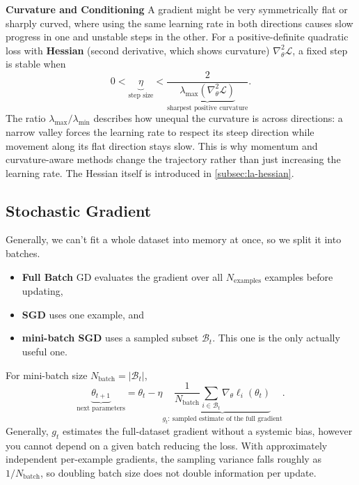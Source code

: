 \textbf{Curvature and Conditioning}
A gradient might be very symmetrically flat or sharply curved, where using the same learning rate in both directions causes slow progress in one and unstable steps in the other.
For a positive-definite quadratic loss with \textbf{Hessian} (second derivative, which shows curvature) $\nabla_\theta^2\mathcal L$, a fixed step is stable when
\[
    0<\underbrace{\eta}_{\text{step size}}
    <\frac{2}{\underbrace{\lambda_{\max}(\nabla_\theta^2\mathcal L)}_{\text{sharpest positive curvature}}}.
\]
The ratio $\lambda_{\max}/\lambda_{\min}$ describes how unequal the curvature is across directions: a narrow valley forces the learning rate to respect its steep direction while movement along its flat direction stays slow.
This is why momentum and curvature-aware methods change the trajectory rather than just increasing the learning rate.
The Hessian itself is introduced in \cref{subsec:la-hessian}.

\subsection{Stochastic Gradient}
\label{sec:optimisation-batch-gradient-descent-vs-sgd-vs-mini-batch-sgd}
Generally, we can't fit a whole dataset into memory at once, so we split it into batches. 
\begin{itemize}
    \item \textbf{Full Batch} GD evaluates the gradient over all $N_{\text{examples}}$ examples before updating,
    \item \textbf{SGD} uses one example, and
    \item \textbf{mini-batch SGD} uses a sampled subset $\mathcal B_t$. This one is the only actually useful one.
\end{itemize}

For mini-batch size $N_{\text{batch}}=|\mathcal B_t|$,
\[
    \underbrace{\theta_{t+1}}_{\text{next parameters}}
    =
    \theta_t-\eta
    \underbrace{\frac{1}{N_{\text{batch}}}
    \sum_{i\in\mathcal B_t}\nabla_\theta\ell_i(\theta_t)}_{g_t:\ \text{sampled estimate of the full gradient}}.
\]
Generally, $g_t$ estimates the full-dataset gradient without a systemic bias, however you cannot depend on a given batch reducing the loss.
With approximately independent per-example gradients, the sampling variance falls roughly as $1/N_{\text{batch}}$, so doubling batch size does not double information per update.


